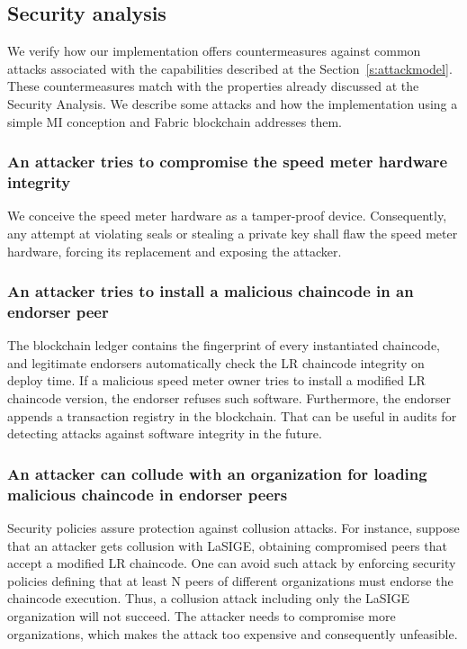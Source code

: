 \documentclass[journal]{IEEEtran}
\begin{document}
\subsection{Security analysis}
We verify how our implementation offers countermeasures against common attacks associated with the capabilities described at the Section~\ref{s:attackmodel}.
These countermeasures match with the properties already discussed at the Security Analysis.
We describe some attacks and how the implementation using a simple MI conception and Fabric blockchain addresses them.

\subsubsection{An attacker tries to compromise the speed meter hardware integrity}
We conceive the speed meter hardware as a tamper-proof device.
Consequently, any attempt at violating seals or stealing a private key shall flaw the speed meter hardware, forcing its replacement and exposing the attacker.

\subsubsection{An attacker tries to install a malicious chaincode in an endorser peer}
The blockchain ledger contains the fingerprint of every instantiated chaincode, and legitimate endorsers automatically check the LR chaincode integrity on deploy time.
If a malicious speed meter owner tries to install a modified LR chaincode version, the endorser refuses such software.
Furthermore, the endorser appends a transaction registry in the blockchain.
That can be useful in audits for detecting attacks against software integrity in the future.

\subsubsection{An attacker can collude with an organization for loading malicious chaincode in endorser peers}
Security policies assure protection against collusion attacks.
For instance, suppose that an attacker gets collusion with LaSIGE, obtaining compromised peers that accept a modified LR chaincode.
One can avoid such attack by enforcing security policies defining that at least N peers of different organizations must endorse the chaincode execution.
Thus, a collusion attack including only the LaSIGE organization will not succeed.
The attacker needs to compromise more organizations, which makes the attack too expensive and consequently unfeasible.
\end{document}
